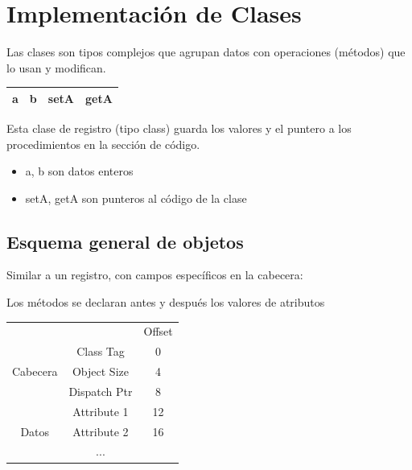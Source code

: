 \documentclass[12pt, twoside, openright]{report} %
\begin{document}
\section{Implementación de Clases}
Las clases son tipos complejos que agrupan datos con operaciones (métodos) que lo usan y modifican.

\begin{table}[h]
  \begin{tabular}{|c|c|c|c|}
  \hline
  a & b & setA & getA \\ \hline
  \end{tabular}
\end{table}

Esta clase de registro (tipo class) guarda los valores y el puntero a los procedimientos en la sección de código.
\begin{itemize}
  \item a,  b son datos enteros
  \item setA, getA son punteros al código de la clase
\end{itemize}

\subsection{Esquema general de objetos}
Similar a un registro, con campos específicos en la cabecera:

Los métodos se declaran antes y después los valores de atributos

\begin{table}[h]
  \begin{tabular}{ccc}
                                                 &                                   & Offset \\ \cline{2-2}
  \multicolumn{1}{c|}{\multirow{3}{*}{Cabecera}} & \multicolumn{1}{c|}{Class Tag}    & 0      \\ \cline{2-2}
  \multicolumn{1}{c|}{}                          & \multicolumn{1}{c|}{Object Size}  & 4      \\ \cline{2-2}
  \multicolumn{1}{c|}{}                          & \multicolumn{1}{c|}{Dispatch Ptr} & 8      \\ \cline{2-2}
  \multicolumn{1}{c|}{\multirow{3}{*}{Datos}}    & \multicolumn{1}{c|}{Attribute 1}  & 12     \\ \cline{2-2}
  \multicolumn{1}{c|}{}                          & \multicolumn{1}{c|}{Attribute 2}  & 16     \\ \cline{2-2}
  \multicolumn{1}{c|}{}                          & \multicolumn{1}{c|}{...}          &        \\ \cline{2-2}
  \end{tabular}
\end{table}
\end{document}
